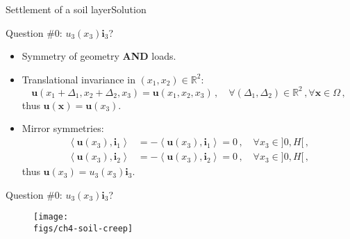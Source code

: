 \documentclass{beamer}
\newcommand{\Rset}{\mathbb{R}}
\newcommand{\uj}{u}
\newcommand{\xj}{x}
\newcommand{\uv}{{\boldsymbol\uj}}
\newcommand{\xv}{{\boldsymbol\xj}}
\renewcommand{\ij}{i}
\newcommand{\iv}{{\boldsymbol\ij}}
\newcommand{\medium}{\Omega}
\newcommand{\scal}[1]{\left\langle{#1}\right\rangle}
\begin{document}
\begin{frame}{Settlement of a soil layer}{Solution}

\begin{overprint}

\vskip-20pt
\begin{exampleblock}{Question \#0: $\uj_3(\xj_3)\iv_3$?}
\begin{itemize}
\item Symmetry of geometry {\bf AND} loads.
\item Translational invariance in $(\xj_1,\xj_2)\in\Rset^2$:
{\footnotesize
\begin{displaymath}
\uv(\xj_1+\Delta_1,\xj_2+\Delta_2,\xj_3)=\uv(\xj_1,\xj_2,\xj_3)\,,\quad\forall(\Delta_1,\Delta_2)\in\Rset^2\,,\forall\xv\in\medium\,,
\end{displaymath}}
thus $\uv(\xv)=\uv(\xj_3)$.
\item Mirror symmetries:
{\footnotesize
\begin{displaymath}
\begin{split}
\scal{\uv(\xj_3),\iv_1} &=-\scal{\uv(\xj_3),\iv_1}=0\,,\quad\forall\xj_3\in]0,H[\,, \\
\scal{\uv(\xj_3),\iv_2} &=-\scal{\uv(\xj_3),\iv_2}=0\,,\quad\forall\xj_3\in]0,H[\,,
\end{split}
\end{displaymath}}
thus $\uv(\xj_3)=\uj_3(\xj_3)\iv_3$.
\end{itemize}
\end{exampleblock}

\vskip-20pt
\begin{exampleblock}{Question \#0: $\uj_3(\xj_3)\iv_3$?}
\begin{figure}
\centering\texttt{[image: \\figs/ch4-soil-creep]}
\end{figure}
\end{exampleblock}

\end{overprint}

\end{frame}
\end{document}
